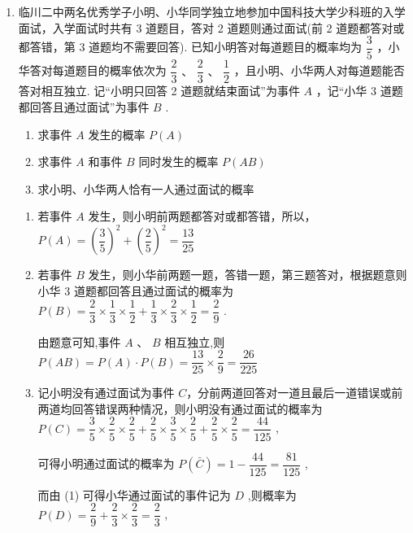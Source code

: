 \begin{enumerate}
\begin{enumerate}
        \item 临川二中两名优秀学子小明、小华同学独立地参加中国科技大学少科班的入学面试，入学面试时共有 3 道题目，答对 2 道题则通过面试(前 2 道题都答对或都答错，第 3 道题均不需要回答). 已知小明答对每道题目的概率均为 $\dfrac{3}{5}$ ，小华答对每道题目的概率依次为 $\dfrac{2}{3}\text{ 、 }\dfrac{2}{3}\text{ 、 }\dfrac{1}{2}$ ，且小明、小华两人对每道题能否答对相互独立. 记“小明只回答 2 道题就结束面试”为事件 $A$ ，记“小华 3 道题都回答且通过面试”为事件 $B$ .
        \begin{enumerate}
            \item 求事件 $A$ 发生的概率 $P\left( A\right)$
            \item 求事件 $A$ 和事件 $B$ 同时发生的概率 $P\left( {AB}\right)$
            \item 求小明、小华两人恰有一人通过面试的概率
        \end{enumerate}
        \begin{jieda}
            \begin{enumerate}
                \item 若事件 $A$ 发生，则小明前两题都答对或都答错，所以， $P\left( A\right)  = {\left( \dfrac{3}{5}\right) }^{2} + {\left( \dfrac{2}{5}\right) }^{2} = \dfrac{13}{25}$
                \item 若事件 $B$ 发生，则小华前两题一题，答错一题，第三题答对，根据题意则小华 3 道题都回答且通过面试的概率为 $P\left( B\right)  = \dfrac{2}{3} \times  \dfrac{1}{3} \times  \dfrac{1}{2} + \dfrac{1}{3} \times  \dfrac{2}{3} \times  \dfrac{1}{2} = \dfrac{2}{9}$ .
                
                由题意可知,事件 $A\text{ 、 }B$ 相互独立,则 $P\left( {AB}\right)  = P\left( A\right)  \cdot  P\left( B\right)  = \dfrac{13}{25} \times  \dfrac{2}{9} = \dfrac{26}{225}$

                \item 记小明没有通过面试为事件 $C$，分前两道回答对一道且最后一道错误或前两道均回答错误两种情况，则小明没有通过面试的概率为 $P\left( C\right)  = \dfrac{3}{5} \times  \dfrac{2}{5} \times  \dfrac{2}{5} + \dfrac{2}{5} \times  \dfrac{3}{5} \times  \dfrac{2}{5} + \dfrac{2}{5} \times  \dfrac{2}{5} = \dfrac{44}{125}$ ,
                
                可得小明通过面试的概率为 $P\left( \bar{C}\right)  = 1 - \dfrac{44}{125} = \dfrac{81}{125}$ ,
                
                而由 (1) 可得小华通过面试的事件记为 $D$ ,则概率为 $P\left( D\right)  = \dfrac{2}{9} + \dfrac{2}{3} \times  \dfrac{2}{3} = \dfrac{2}{3}$ ,
                

\end{enumerate}
\end{jieda}
\end{enumerate}
\end{enumerate}
